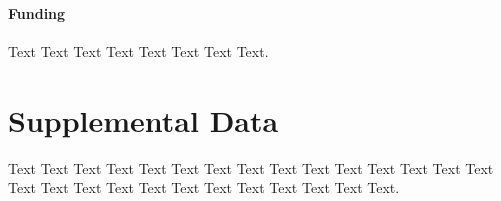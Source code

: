 \documentclass{frontiersSCNS} %
\begin{document}
\paragraph{Funding\textcolon} Text Text Text Text Text Text  Text Text.

\section*{Supplemental Data} Text Text Text Text Text Text  Text Text Text Text
Text Text Text Text Text  Text Text Text Text Text Text Text Text Text  Text
Text Text.


\end{document}

